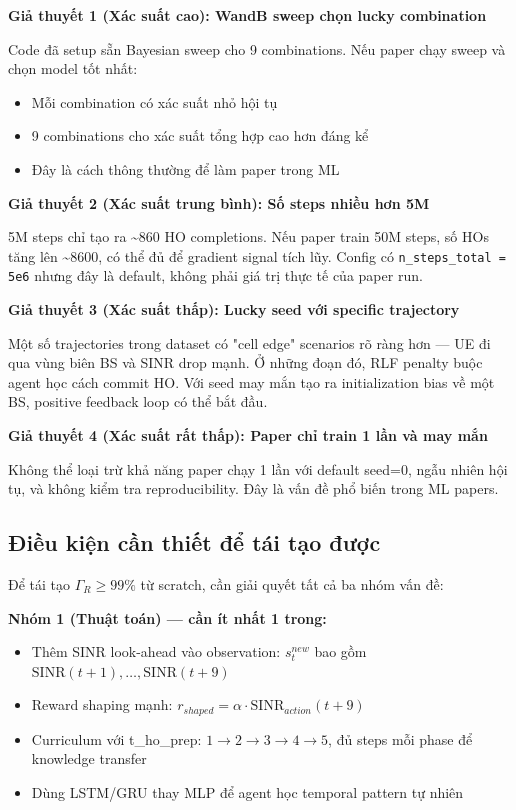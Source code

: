 \documentclass[11pt]{article}
\begin{document}
\textbf{Giả thuyết 1 (Xác suất cao): WandB sweep chọn lucky combination}

Code đã setup sẵn Bayesian sweep cho 9 combinations. Nếu paper chạy sweep và chọn model tốt nhất:
\begin{itemize}
  \item Mỗi combination có xác suất nhỏ hội tụ
  \item 9 combinations cho xác suất tổng hợp cao hơn đáng kể
  \item Đây là cách thông thường để làm paper trong ML
\end{itemize}

\textbf{Giả thuyết 2 (Xác suất trung bình): Số steps nhiều hơn 5M}

5M steps chỉ tạo ra \textasciitilde 860 HO completions. Nếu paper train 50M steps, số HOs tăng lên \textasciitilde 8600, có thể đủ để gradient signal tích lũy. Config có \texttt{n\_steps\_total = 5e6} nhưng đây là default, không phải giá trị thực tế của paper run.

\textbf{Giả thuyết 3 (Xác suất thấp): Lucky seed với specific trajectory}

Một số trajectories trong dataset có "cell edge" scenarios rõ ràng hơn --- UE đi qua vùng biên BS và SINR drop mạnh. Ở những đoạn đó, RLF penalty buộc agent học cách commit HO. Với seed may mắn tạo ra initialization bias về một BS, positive feedback loop có thể bắt đầu.

\textbf{Giả thuyết 4 (Xác suất rất thấp): Paper chỉ train 1 lần và may mắn}

Không thể loại trừ khả năng paper chạy 1 lần với default seed=0, ngẫu nhiên hội tụ, và không kiểm tra reproducibility. Đây là vấn đề phổ biến trong ML papers.

\subsection{Điều kiện cần thiết để tái tạo được}

Để tái tạo $\Gamma_R \geq 99\%$ từ scratch, cần giải quyết tất cả ba nhóm vấn đề:

\textbf{Nhóm 1 (Thuật toán) --- cần ít nhất 1 trong:}
\begin{itemize}
  \item[$\square$] Thêm SINR look-ahead vào observation: $s_t^{new}$ bao gồm $\text{SINR}(t+1), \ldots, \text{SINR}(t+9)$
  \item[$\square$] Reward shaping mạnh: $r_{shaped} = \alpha \cdot \text{SINR}_{action}(t+9)$
  \item[$\square$] Curriculum với t\_ho\_prep: $1\to2\to3\to4\to5$, đủ steps mỗi phase để knowledge transfer
  \item[$\square$] Dùng LSTM/GRU thay MLP để agent học temporal pattern tự nhiên
\end{itemize}
\end{document}
